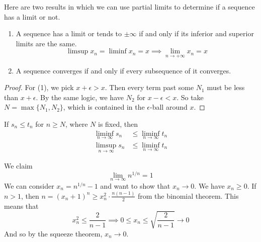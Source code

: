   \begin{theorem}
    Here are two results in which we can use partial limits to determine if a sequence has a limit or not. 
    \begin{enumerate}
      \item A sequence has a limit or tends to $\pm \infty$ if and only if its inferior and superior limits are the same. 
      \begin{equation}
        \limsup x_n = \liminf x_n = x \implies \lim_{n \rightarrow +\infty} x_n = x
      \end{equation}
      \item A sequence converges if and only if every subsequence of it converges. 
    \end{enumerate}
  \end{theorem}
  \begin{proof}
    For (1), we pick $x + \epsilon > x$. Then every term past some $N_1$ must be less than $x + \epsilon$. By the same logic, we have $N_2$ for $x - \epsilon < x$. So take $N = \max\{N_1, N_2\}$, which is contained in the $\epsilon$-ball around $x$. 
  \end{proof}

  \begin{theorem}
    If $s_n \leq t_n$ for $n \geq N$, where $N$ is fixed, then 
    \begin{align*}
      \liminf_{n \rightarrow \infty} s_n & \leq \liminf_{n \rightarrow \infty} t_n \\
      \limsup_{n \rightarrow \infty} s_n & \leq \liminf_{n \rightarrow \infty} t_n 
    \end{align*}
  \end{theorem} 

  \begin{example}
    We claim 
    \begin{equation}
      \lim_{n \rightarrow \infty} n^{1/n} = 1 
    \end{equation}
    We can consider $x_n = n^{1/n} - 1$ and want to show that $x_n \rightarrow 0$. We have $x_n \geq 0$. If $n > 1$, then $n = (x_n + 1)^n \geq x_n^2 \cdot \frac{n(n - 1)}{2}$ from the binomial theorem. This means that 
    \begin{equation}
      x_n^2 \leq \frac{2}{n-1} \implies 0 \leq x_n \leq \sqrt{\frac{2}{n-1}} \rightarrow 0
    \end{equation}
    And so by the squeeze theorem, $x_n \rightarrow 0$. 
  \end{example}

